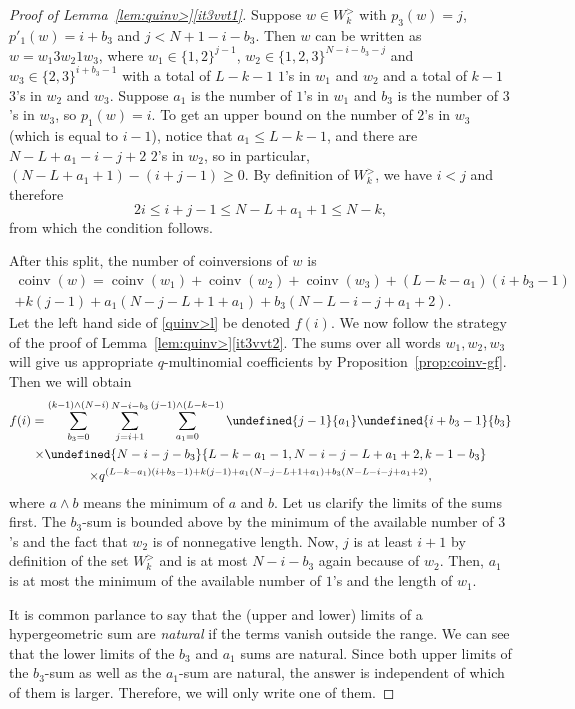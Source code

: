 \documentclass[11pt]{article}
\theoremstyle{definition}
\providecommand{\qbinom}[2]{\genfrac{[}{]}{0pt}{}{#1}{#2}}
\numberwithin{equation}{section}
\DeclareMathOperator{\coinv}{coinv}
\let\qbinom\undefined
\newcommand{\qbinom}[2]{\bgroup\renewcommand*{\arraystretch}{1}\begin{bmatrix} #1 \\ #2\end{bmatrix} \egroup}
\begin{document}
\begin{proof}[Proof of Lemma~\ref{lem:quinv>}\ref{it3vvt1}]
Suppose $w \in  W_k^>$ with $p_3(w) = j$, $p'_1(w) = i+b_3$ and $j < N+1 - i-b_3$. Then
$w$ can be written as $w = w_1 3 w_2 1 w_3$, where $w_1 \in \{1,2\}^{j-1}$, $w_2 \in \{1,2,3\}^{N-i-b_3-j}$ 
and $w_3 \in \{2,3\}^{i+b_3-1}$ with a total of $L-k-1$ $1$'s in $w_1$ and $w_2$ and a total of
$k-1$ $3$'s in $w_2$ and $w_3$. 
Suppose $a_1$ is the number of $1$'s in $w_1$ and $b_3$ is the number of $3$'s in $w_3$, so $p_1(w) = i$. To get an upper bound on the number of $2$'s in $w_3$ (which is equal to $i-1$), notice that $a_1 \leq L-k-1$, and there are $N-L+a_1-i-j+2$ $2$'s in $w_2$, so in particular, $(N-L+a_1+1) -(i+j-1) \geq 0$. By definition of $W_k^>$, we have $i < j$ and therefore
\[
2i \leq i+j-1 \leq N - L + a_1 + 1 \leq N - k,
\]
from which the condition follows.

After this split, the number of coinversions of $w$ is
\begin{multline*}
\coinv(w) = \coinv(w_1) + \coinv(w_2) +\coinv(w_3) + (L-k-a_1)(i+b_3-1)  \\
+ k(j-1) + a_1(N-j-L+1+a_1) + b_3(N-L-i-j+a_1+2).
\end{multline*}
Let the left hand side of \eqref{quinv>l} be denoted $f(i)$.
We now follow the strategy of the proof of Lemma~\ref{lem:quinv>}\ref{it3vvt2}. The sums over all
words $w_1, w_2, w_3$ will give us appropriate $q$-multinomial coefficients by 
Proposition~\ref{prop:coinv-gf}. Then we will obtain
\begin{multline*}
f(i) =  \sum_{b_3 = 0}^{(k-1) \wedge (N-i)}   \sum_{j=i+1}^{N-i-b_3}  \sum_{a_1 = 0}^{(j-1) \wedge (L-k-1)} 
\qbinom {j-1}{a_1} \qbinom{i+b_3-1}{b_3}\\
\times \qbinom {N-i-j-b_3}{L-k-a_1-1, N-i-j-L+a_1+2,k-1-b_3} \\
\times q^{(L-k-a_1)(i+b_3-1) + k(j-1) + a_1(N-j-L+1+a_1) + b_3(N-L-i-j+a_1+2)},
\end{multline*}
where $a \wedge b$ means the minimum of $a$ and $b$.
Let us clarify the limits of the sums first. 
The $b_3$-sum is bounded above by the minimum
of the available number of $3$'s and the fact that $w_2$ is of nonnegative length. 
Now, $j$ is at least $i+1$ by definition of the set 
$W_k^>$ and is at most $N-i-b_3$ again because of $w_2$.
Then, $a_1$ is at most the minimum of the available number of $1$'s and the length
of $w_1$.

It is common parlance to say that the (upper and lower) limits of a hypergeometric sum are \emph{natural} if the terms vanish outside the range. We can see that the lower limits of the $b_3$ and $a_1$ sums are natural. Since both upper limits of the $b_3$-sum as well as the $a_1$-sum are natural, the answer is independent of which of them is larger. Therefore, we will only write one of them.


\end{proof}
\end{document}
